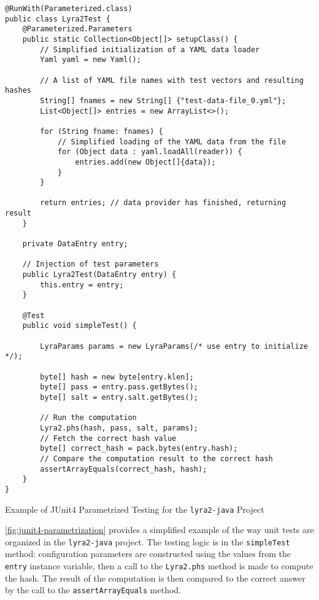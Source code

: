 \begin{listing}
\small
\begin{verbatim}
@RunWith(Parameterized.class)
public class Lyra2Test {
    @Parameterized.Parameters
    public static Collection<Object[]> setupClass() {
        // Simplified initialization of a YAML data loader
        Yaml yaml = new Yaml();

        // A list of YAML file names with test vectors and resulting hashes
        String[] fnames = new String[] {"test-data-file_0.yml"};
        List<Object[]> entries = new ArrayList<>();

        for (String fname: fnames) {
            // Simplified loading of the YAML data from the file
            for (Object data : yaml.loadAll(reader)) {
                entries.add(new Object[]{data});
            }
        }

        return entries; // data provider has finished, returning result
    }

    private DataEntry entry;

    // Injection of test parameters
    public Lyra2Test(DataEntry entry) {
        this.entry = entry;
    }

    @Test
    public void simpleTest() {

        LyraParams params = new LyraParams(/* use entry to initialize */);

        byte[] hash = new byte[entry.klen];
        byte[] pass = entry.pass.getBytes();
        byte[] salt = entry.salt.getBytes();

        // Run the computation
        Lyra2.phs(hash, pass, salt, params);
        // Fetch the correct hash value
        byte[] correct_hash = pack.bytes(entry.hash);
        // Compare the computation result to the correct hash
        assertArrayEquals(correct_hash, hash);
    }
}
\end{verbatim}
\normalsize
\caption{Example of JUnit4 Parametrized Testing for the \texttt{lyra2-java} Project}
\label{fig:junit4-parametrization}
\end{listing}

\autoref{fig:junit4-parametrization} provides a simplified example of the way unit tests are organized in the \texttt{lyra2-java} project. The testing logic is in the \texttt{simpleTest} method: configuration parameters are constructed using the values from the \texttt{entry} instance variable, then a call to the \texttt{Lyra2.phs} method is made to compute the hash. The result of the computation is then compared to the correct answer by the call to the \texttt{assertArrayEquals} method.

